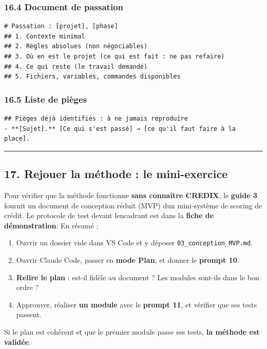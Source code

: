 \documentclass[
  french,
  11pt,
  a4paper,
]{article}
\providecommand{\tightlist}{%
  \setlength{\itemsep}{0pt}\setlength{\parskip}{0pt}}
\begin{document}
\subsubsection{16.4 Document de
passation}\label{164-document-de-passation}

\begin{Verbatim}[breaklines=true,breakanywhere=true,fontsize=\small,frame=leftline,framerule=1.6pt,rulecolor=\color{credixblue},framesep=3mm,xleftmargin=2mm,xrightmargin=1mm]
# Passation : [projet], [phase]
## 1. Contexte minimal
## 2. Règles absolues (non négociables)
## 3. Où en est le projet (ce qui est fait : ne pas refaire)
## 4. Ce qui reste (le travail demandé)
## 5. Fichiers, variables, commandes disponibles
\end{Verbatim}

\subsubsection{16.5 Liste de pièges}\label{165-liste-de-piuxe8ges}

\begin{Verbatim}[breaklines=true,breakanywhere=true,fontsize=\small,frame=leftline,framerule=1.6pt,rulecolor=\color{credixblue},framesep=3mm,xleftmargin=2mm,xrightmargin=1mm]
## Pièges déjà identifiés : à ne jamais reproduire
- **[Sujet].** [Ce qui s'est passé] → [ce qu'il faut faire à la place].
\end{Verbatim}

\begin{center}\rule{0.5\linewidth}{0.5pt}\end{center}

\subsection{17. Rejouer la méthode : le
mini-exercice}\label{17-rejouer-la-muxe9thode--le-mini-exercice}

Pour vérifier que la méthode fonctionne \textbf{sans connaître CREDIX},
le \textbf{guide 3} fournit un document de conception réduit (MVP)
d\textquotesingle un mini-système de scoring de crédit. Le protocole de
test devant l\textquotesingle encadrant est dans la \textbf{fiche de
démonstration}. En résumé :

\begin{enumerate}
\def\labelenumi{\arabic{enumi}.}
\tightlist
\item
  Ouvrir un dossier vide dans VS Code et y déposer
  \texttt{03\_\allowbreak{}conception\_\allowbreak{}MVP.\allowbreak{}md}.
\item
  Ouvrir Claude Code, passer en \textbf{mode Plan}, et donner le
  \textbf{prompt 10}.
\item
  \textbf{Relire le plan} : est-il fidèle au document ? Les modules
  sont-ils dans le bon ordre ?
\item
  Approuver, réaliser \textbf{un module} avec le \textbf{prompt 11}, et
  vérifier que ses tests passent.
\end{enumerate}

Si le plan est cohérent et que le premier module passe ses tests,
\textbf{la méthode est validée}.
\end{document}
